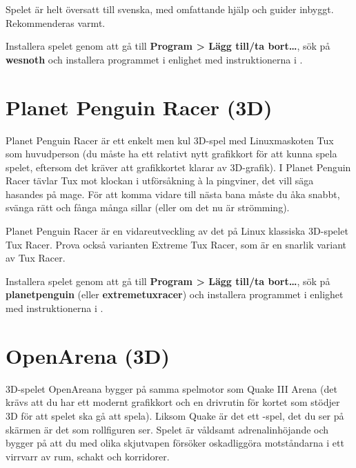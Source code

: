 \documentclass[a4paper,final]{memoir} %
\begin{document}
Spelet är helt översatt till svenska, med omfattande hjälp och guider inbyggt. Rekommenderas varmt.


Installera spelet genom att gå till \textbf{Program \textgreater{} Lägg till/ta bort\ldots{}}, sök på \textbf{wesnoth} och installera programmet i enlighet med instruktionerna i .

\section{Planet Penguin Racer (3D)}

Planet Penguin Racer är ett enkelt men kul 3D-spel med Linuxmaskoten Tux som huvudperson (du måste ha ett relativt nytt grafikkort för att kunna spela spelet, eftersom det kräver att grafikkortet klarar av 3D-grafik). I Planet Penguin Racer tävlar Tux mot klockan i utförsåkning à la pingviner, det vill säga hasandes på mage. För att komma vidare till nästa bana måste du åka snabbt, svänga rätt och fånga många sillar (eller om det nu är strömming).


Planet Penguin Racer är en vidareutveckling av det på Linux klassiska 3D-spelet Tux Racer. Prova också varianten Extreme Tux Racer, som är en snarlik variant av Tux Racer.

Installera spelet genom att gå till \textbf{Program \textgreater{} Lägg till/ta bort\ldots{}}, sök på \textbf{planetpenguin} (eller \textbf{extremetuxracer}) och installera programmet i enlighet med instruktionerna i .

\section{OpenArena (3D)}

3D-spelet OpenAreana bygger på samma spelmotor som Quake III Arena (det krävs att du har ett modernt grafikkort och en drivrutin för kortet som stödjer 3D för att spelet ska gå att spela). Liksom Quake är det ett -spel, det du ser på skärmen är det som rollfiguren ser. Spelet är våldsamt adrenalinhöjande och bygger på att du med olika skjutvapen försöker oskadliggöra motståndarna i ett virrvarr av rum, schakt och korridorer.
\end{document}
